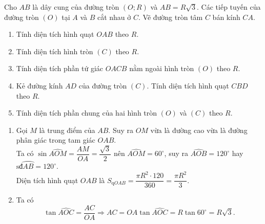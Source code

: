 \begin{bt}%
	Cho $AB$ là dây cung của đường tròn $(O;R)$ và $AB=R\sqrt{3}$. Các tiếp tuyến của đường tròn $(O)$ tại $A$ và $B$ cắt nhau ở $C$. Vẽ đường tròn tâm $C$ bán kính $CA$.
	\begin{enumerate}
		\item Tính diện tích hình quạt $OAB$ theo $R$.
		\item Tính diện tích hình tròn $(C)$ theo $R$.
		\item Tính diện tích phần tứ giác $OACB$ nằm ngoài hình tròn $(O)$ theo $R$.
		\item Kẻ đường kính $AD$ của đường tròn $(C)$. Tính diện tích hình quạt $CBD$ theo $R$.
		\item Tính diện tích phần chung của hai hình tròn $(O)$ và $(C)$ theo $R$.
	\end{enumerate}
	\loigiai
	{
		\begin{center}
		\end{center}
		\begin{enumerate}
			\item Gọi $M$ là trung điểm của $AB$. Suy ra $OM$ vừa là đường cao vừa là đường phân giác trong tam giác $OAB$.\\
			Ta có $\sin\widehat{AOM} = \dfrac{AM}{OA} = \dfrac{\sqrt{3}}{2}$ nên $\widehat{AOM} = 60^\circ$, suy ra $\widehat{AOB}=120^\circ$ hay $\text{sđ}\wideparen{AB}=120^\circ$.\\
			Diện tích hình quạt $OAB$ là $S_{\text{q}OAB} = \dfrac{\pi R^2 \cdot 120}{360} = \dfrac{\pi R^2}{3}$.
			\item Ta có
			$$\tan\widehat{AOC} = \dfrac{AC}{OA} \Rightarrow AC = OA\tan\widehat{AOC} = R\tan 60^\circ = R\sqrt{3}.$$

\end{enumerate}}
\end{bt}
